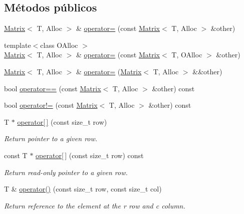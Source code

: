 \subsection*{Métodos públicos}
\begin{DoxyCompactItemize}
\item 
\hyperlink{classanpi_1_1Matrix}{Matrix}$<$ T, Alloc $>$ \& \hyperlink{classanpi_1_1Matrix_a94adb04f158cd8045eaef69fa47effc6}{operator=} (const \hyperlink{classanpi_1_1Matrix}{Matrix}$<$ T, Alloc $>$ \&other)
\item 
{\footnotesize template$<$class O\+Alloc $>$ }\\\hyperlink{classanpi_1_1Matrix}{Matrix}$<$ T, Alloc $>$ \& \hyperlink{classanpi_1_1Matrix_a59ccc766804762b9ec9a2186cbddbacc}{operator=} (const \hyperlink{classanpi_1_1Matrix}{Matrix}$<$ T, O\+Alloc $>$ \&other)
\item 
\hyperlink{classanpi_1_1Matrix}{Matrix}$<$ T, Alloc $>$ \& \hyperlink{classanpi_1_1Matrix_a7995acac7bc35fe918dbec071c2b2359}{operator=} (\hyperlink{classanpi_1_1Matrix}{Matrix}$<$ T, Alloc $>$ \&\&other)
\item 
bool \hyperlink{classanpi_1_1Matrix_aa3ea7a77b2c5e5e5b7ef95bde6981a85}{operator==} (const \hyperlink{classanpi_1_1Matrix}{Matrix}$<$ T, Alloc $>$ \&other) const
\item 
bool \hyperlink{classanpi_1_1Matrix_ac5dc646cee3d1a736acfa431076e1f37}{operator!=} (const \hyperlink{classanpi_1_1Matrix}{Matrix}$<$ T, Alloc $>$ \&other) const
\item 
T $\ast$ \hyperlink{classanpi_1_1Matrix_a26b55be70c6d8719bf59b2ca32f6c8b4}{operator\mbox{[}$\,$\mbox{]}} (const size\+\_\+t row)
\begin{DoxyCompactList}\small\item\em Return pointer to a given row. \end{DoxyCompactList}\item 
const T $\ast$ \hyperlink{classanpi_1_1Matrix_a1795fbe980e38936d36065831ef3d3a6}{operator\mbox{[}$\,$\mbox{]}} (const size\+\_\+t row) const
\begin{DoxyCompactList}\small\item\em Return read-\/only pointer to a given row. \end{DoxyCompactList}\item 
T \& \hyperlink{classanpi_1_1Matrix_a956c10f1e9f46bdc4a09919f4ecc1de1}{operator()} (const size\+\_\+t row, const size\+\_\+t col)
\begin{DoxyCompactList}\small\item\em Return reference to the element at the r row and c column. \end{DoxyCompactList}\item 

\end{DoxyCompactItemize}
